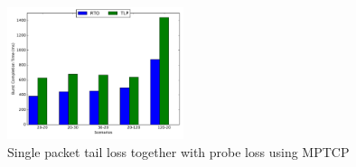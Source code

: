 \documentclass[10pt,draftcls,twocolumn]{IEEEconf}
\begin{document}
\begin{figure}[!ht]
\begin{center}
\includegraphics[angle=0, width=0.46\textwidth, natwidth=578.16,natheight=433.62]{plots/1PP.pdf}
\caption{Single packet tail loss together with probe loss using MPTCP}\label{1pp}
\end{center}
\end{figure}










\end{document}
